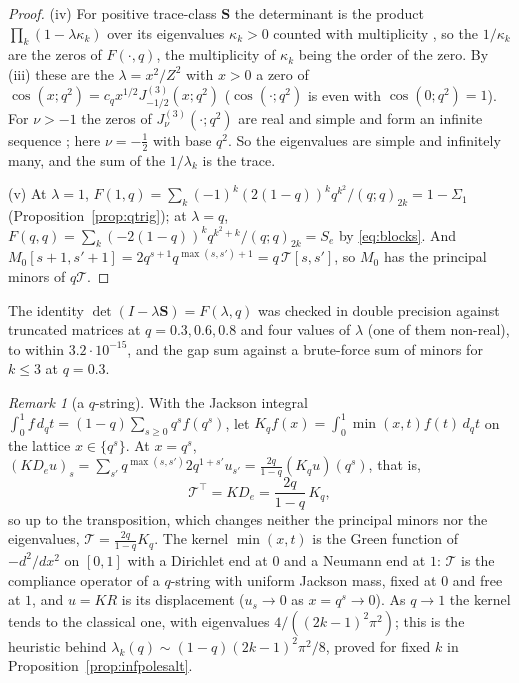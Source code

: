 \documentclass[11pt]{article}
\theoremstyle{plain}
\theoremstyle{definition}
\theoremstyle{remark}
\newtheorem{remark}[theorem]{Remark}
\begin{document}
\begin{proof}
(iv) For positive trace-class $\mathbf S$ the determinant is the product
$\prod_k(1-\lambda\kappa_k)$ over its eigenvalues $\kappa_k>0$ counted with multiplicity
\cite[Ch.~3]{Simon}, so the $1/\kappa_k$ are the zeros of $F(\cdot,q)$, the multiplicity of
$\kappa_k$ being the order of the zero. By \textup{(iii)} these are the $\lambda=x^2/Z^2$ with $x>0$
a zero of $\cos(x;q^2)=c_qx^{1/2}J^{(3)}_{-1/2}(x;q^2)$ ($\cos(\cdot;q^2)$ is even with
$\cos(0;q^2)=1$). For $\nu>-1$ the zeros of $J^{(3)}_\nu(\cdot;q^2)$ are real and simple and form
an infinite sequence \cite[Cor.~3.2, Lemma~3.3, Thm.~3.4]{KoelinkSwarttouw1994}; here
$\nu=-\tfrac12$ with base $q^2$. So the eigenvalues are simple and infinitely many, and the sum of
the $1/\lambda_k$ is the trace.

(v) At $\lambda=1$, $F(1,q)=\sum_k(-1)^k(2(1-q))^kq^{k^2}/(q;q)_{2k}=1-\Sigma_1$
(Proposition~\ref{prop:qtrig}); at $\lambda=q$, $F(q,q)=\sum_k(-2(1-q))^kq^{k^2+k}/(q;q)_{2k}=S_e$
by \eqref{eq:blocks}. And $M_0[s+1,s'+1]=2q^{s+1}q^{\max(s,s')+1}=q\,\mathcal T[s,s']$, so $M_0$
has the principal minors of $q\mathcal T$.
\end{proof}

\noindent The identity $\det(I-\lambda\mathbf S)=F(\lambda,q)$ was checked in double precision
against truncated matrices at $q=0.3,0.6,0.8$ and four values of $\lambda$ (one of them non-real),
to within $3.2\cdot10^{-15}$, and the gap sum against a brute-force sum of minors for $k\le3$ at
$q=0.3$.

\begin{remark}[a $q$-string]\label{rem:qstring}
With the Jackson integral $\int_0^1f\,d_qt=(1-q)\sum_{s\ge0}q^sf(q^s)$, let
$K_qf(x)=\int_0^1\min(x,t)f(t)\,d_qt$ on the lattice $x\in\{q^s\}$. At $x=q^s$,
$(KD_eu)_s=\sum_{s'}q^{\max(s,s')}2q^{1+s'}u_{s'}=\tfrac{2q}{1-q}(K_qu)(q^s)$, that is,
\[
   \mathcal T^{\!\top}=KD_e=\frac{2q}{1-q}\,K_q ,
\]
so up to the transposition, which changes neither the principal minors nor the eigenvalues,
$\mathcal T=\tfrac{2q}{1-q}K_q$. The kernel $\min(x,t)$ is the Green function of $-d^2/dx^2$ on
$[0,1]$ with a Dirichlet end at $0$ and a Neumann end at $1$: $\mathcal T$ is the compliance operator
of a $q$-string with uniform Jackson mass, fixed at $0$ and free at $1$, and $u=KR$ is its
displacement ($u_s\to0$ as $x=q^s\to0$). As $q\to1$ the kernel tends to the classical one, with
eigenvalues $4/((2k-1)^2\pi^2)$; this is the heuristic behind
$\lambda_k(q)\sim(1-q)(2k-1)^2\pi^2/8$, proved for fixed $k$ in
Proposition~\ref{prop:infpolesalt}.
\end{remark}
\end{document}
